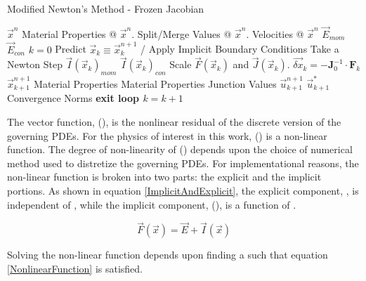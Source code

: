 \begin{algo}
\setlength{\baselineskip}{0.625\baselineskip}
\label{ModifiedNewtonsAlgorithm}
\caption{Modified Newton's Method - Frozen Jacobian}
\begin{algorithmic}[1]
\Define $\vec{x}^{n}$
\Calculate Material Properties @ $\vec{x}^{n}$.
\Calculate Split/Merge Values @ $\vec{x}^{n}$.
\Calculate Velocities @ $\vec{x}^{n}$
\Calculate $\vec{E}_{mom}$
\Calculate $\vec{E}_{con}$
\Set $k = 0$
\BlackBox Predict $\vec{x}_{k} \equiv \vec{x}^{n+1}_{k}$ / Apply Implicit Boundary Conditions
\Loop \quad Take a Newton Step
  \Calculate $\vec{I}(\vec{x}_{k})_{mom}$
  \Calculate $\vec{I}(\vec{x}_{k})_{con}$
  \BlackBox Scale $\vec{F}(\vec{x}_k)$ and $\vec{J}(\vec{x}_{k})$.
  \BlackBox $\Vec{\delta x}_k = -\mathbf{J}^{-1}_0\cdot \mathbf{F}_k$ 
  \BlackBox $\Vec{x}^{n+1}_{k+1}$ 
  \Update Material Properties 
  \Test Material Properties
  \Update Junction Values 
  \Update $\vec{u}^{n+1}_{k+1}$ 
  \Update $\Vec{u}^{*}_{k+1}$ 
  \Calculate Convergence Norms
    \State \bf{exit loop}
  \EndIf
\EndLoop \quad $k = k+1$
\end{algorithmic}
\end{algo}



The vector function, (), is the nonlinear residual of the discrete version of the governing PDEs.
For the physics of interest in this work, () is a non-linear function.
The degree of non-linearity of () depends upon the choice of numerical method used to distretize the governing PDEs.
For implementational reasons, the non-linear function is broken into two parts: the explicit and the implicit portions.
As shown in equation \eqref{ImplicitAndExplicit}, the explicit component, , is independent of , while the implicit component, (), is a function of .

\begin{equation}
\label{ImplicitAndExplicit}
\Vec{F}(\Vec{x}) = \Vec{E} + \Vec{I}(\Vec{x})
\end{equation}

Solving the non-linear function depends upon finding a  such that equation \eqref{NonlinearFunction} is satisfied.

